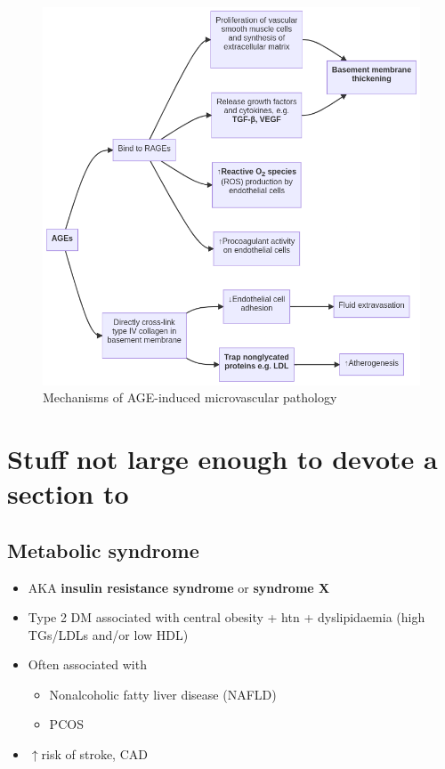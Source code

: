\documentclass[
  12pt,
]{memoir}
\providecommand{\tightlist}{%
  \setlength{\itemsep}{0pt}\setlength{\parskip}{0pt}}
\begin{document}
\pagebreak

\null
\vfill
\begin{figure}[h!]
    \centering
    \includegraphics[width=1\textwidth]{../assets/med/DM-AGE.png}
    \vspace{12mm}
    \caption{Mechanisms of AGE-induced microvascular pathology}
    \label{fig:dm-age}
\end{figure}
\vfill

\pagebreak

\hypertarget{stuff-not-large-enough-to-devote-a-section-to-2}{%
\section{Stuff not large enough to devote a section
to}\label{stuff-not-large-enough-to-devote-a-section-to-2}}

\hypertarget{metabolic-syndrome}{%
\subsection{Metabolic syndrome}\label{metabolic-syndrome}}

\begin{itemize}
\tightlist
\item
  AKA \textbf{insulin resistance syndrome} or \textbf{syndrome X}
\item
  Type 2 DM associated with central obesity + htn + dyslipidaemia (high
  TGs/LDLs and/or low HDL)
\item
  Often associated with

  \begin{itemize}
  \tightlist
  \item
    Nonalcoholic fatty liver disease (NAFLD)
  \item
    PCOS
  \end{itemize}
\item
  \(\uparrow\)risk of stroke, CAD
\end{itemize}
\end{document}
